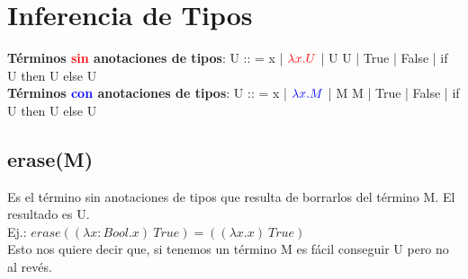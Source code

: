 \documentclass[10pt,a4paper]{article}
\begin{document}
\section*{Inferencia de Tipos}
\textbf{Términos \textcolor{red}{sin} anotaciones de tipos}: U :: = x | $\textcolor{red}{\lambda x.U}$ | U U | True | False | if U then U else U \\
\textbf{Términos \textcolor{blue}{con} anotaciones de tipos}: U :: = x | $\textcolor{blue}{\lambda x.M}$ | M M | True | False | if U then U else U
\subsection*{erase(M)}
Es el término sin anotaciones de tipos que resulta de borrarlos del término M. El resultado es U. \\
Ej.: $erase((\lambda x:Bool . x) \ True) = ((\lambda x . x) \ True)$ \\
Esto nos quiere decir que, si tenemos un término M es fácil conseguir U pero no al revés. 
\end{document}
